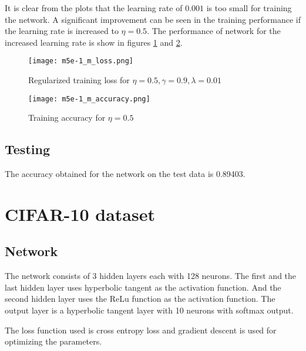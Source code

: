 \documentclass{article}
\begin{document}
It is clear from the plots that the learning rate of $0.001$ is too small for training the network. A
significant improvement can be seen in the training performance if the learning rate is increased to $\eta = 0.5$.
The performance of network for the increased learning rate is show in figures \ref{fig:mnist_one_loss} and \ref{fig:mnist_one_accuracy}.

\begin{figure}[!ht]
  \texttt{[image: m5e-1\_m\_loss.png]}
  \caption{Regularized training loss for $\eta = 0.5, \gamma = 0.9, \lambda=0.01$}
  \label{fig:mnist_one_loss}
\end{figure}

\begin{figure}[!ht]
  \texttt{[image: m5e-1\_m\_accuracy.png]}
  \caption{Training accuracy for $\eta = 0.5$}
  \label{fig:mnist_one_accuracy}
\end{figure}

\subsection{Testing}
The accuracy obtained for the network on the test data is 0.89403.

\section {CIFAR-10 dataset}
\subsection{Network}
The network consists of 3 hidden layers each with 128 neurons.  The first and the last
hidden layer uses hyperbolic tangent as the activation function. And the second
hidden layer uses the ReLu function as the activation function. The output layer is
a hyperbolic tangent layer with 10 neurons with softmax output.

The loss function used is cross entropy loss and gradient descent is used for
optimizing the parameters.
\end{document}
